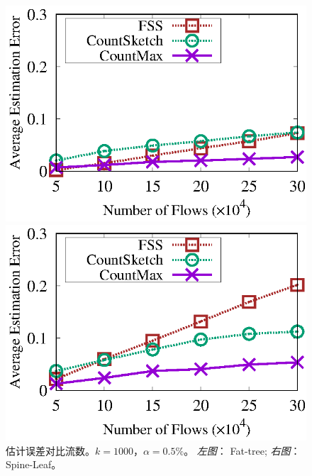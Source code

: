 \begin{figure}[!t]
	\centering
	\begin{minipage}[t]{0.49\linewidth}
		\centering
		\includegraphics[width=\linewidth]{fig/ft_flow_appr_1000_095.eps}
	\end{minipage}\vspace{-0.6em}%
	\begin{minipage}[t]{0.49\linewidth}
		\centering
		\includegraphics[width=\linewidth]{fig/hy_flow_appr_1000_095.eps}
	\end{minipage}\vspace{-0.6em}
	\caption{\textnormal{估计误差对比流数。$k=1000$，$\alpha = 0.5\%$。 \textit{左图}： Fat-tree; \textit{右图}： Spine-Leaf。}}
	\label{fig:acc,f,1000,5}
\end{figure}

